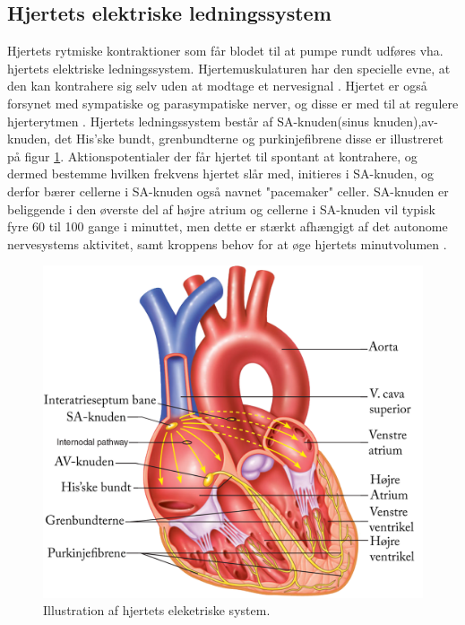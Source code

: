\subsection{Hjertets elektriske ledningssystem}\label{Hjertets_elektriske_ledningssystem}
Hjertets rytmiske kontraktioner som får blodet til at pumpe rundt udføres vha. hjertets elektriske ledningssystem. Hjertemuskulaturen har den specielle evne, at den kan kontrahere sig selv uden at modtage et nervesignal \cite{gronanatomi}. Hjertet er også forsynet med sympatiske og parasympatiske nerver, og disse er med til at regulere hjerterytmen \cite{cindy}. Hjertets ledningssystem består af SA-knuden(sinus knuden),av-knuden, det His'ske bundt, grenbundterne og purkinjefibrene disse er illustreret på figur \ref{fig:hjerte_elektriske}. Aktionspotentialer der får hjertet til spontant at kontrahere, og dermed bestemme hvilken frekvens hjertet slår med, initieres i SA-knuden, og derfor bærer cellerne i SA-knuden også navnet "pacemaker" celler. SA-knuden er beliggende i den øverste del af højre atrium og cellerne i SA-knuden vil typisk fyre 60 til 100 gange i minuttet, men dette er stærkt afhængigt af det autonome nervesystems aktivitet, samt kroppens behov for at øge hjertets
minutvolumen \cite{ekgbook}.

\begin{figure}[H] %
\begin{center}
\includegraphics[width=1\textwidth]{figures/hjertet_elektriske}
\end{center}
\caption{Illustration af hjertets eleketriske system\cite{cindy}.}
\label{fig:hjerte_elektriske}
\end{figure}


